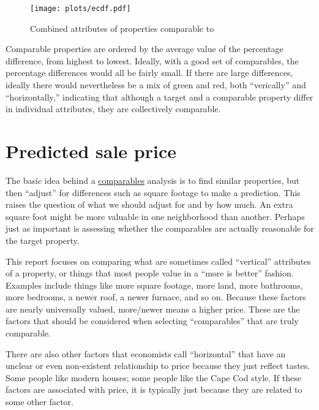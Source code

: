 \documentclass[
12pt, %
letterpaper, %
oneside, %
headinclude,footinclude, %
BCOR5mm, %
]{scrartcl}
\begin{document}
\begin{figure}
\centering
\caption{Combined attributes of properties comparable to \PropertyName{}} \label{fig:ecdf}  
\texttt{[image: plots/ecdf.pdf]} 
\end{figure}

Comparable properties are ordered by the average value of the percentage difference, from highest to lowest.
Ideally, with a good set of comparables, the percentage differences would all be fairly small.
If there are large differences, ideally there would nevertheless be a mix of green and red, both ``verically'' and ``horizontally,'' indicating that although a target and a comparable property differ in individual attributes, they are collectively comparable.


\section{Predicted sale price}
The basic idea behind a \href{https://en.wikipedia.org/wiki/Comparables}{comparables} analysis is to find similar properties, but then ``adjust'' for differences such as square footage to make a prediction.
This raises the question of what we should adjust for and by how much.
An extra square foot might be more valuable in one neighborhood than another. 
Perhaps just as important is assessing whether the comparables are actually reasonable for the target property. 

This report focuses on comparing what are sometimes called ``vertical'' attributes of a property, or things that most people value in a ``more is better'' fashion.
Examples include things like more square footage, more land, more bathrooms, more bedrooms, a newer roof, a newer furnace, and so on.
Because these factors are nearly universally valued, more/newer means a higher price.
These are the factors that should be considered when selecting ``comparables'' that are truly comparable. 

There are also other factors that economists call ``horizontal'' that have an unclear or even non-existent relationship to price because they just reflect tastes.
Some people like modern houses; some people like the Cape Cod style.
If these factors are associated with price, it is typically just because they are related to some other factor.
\end{document}
